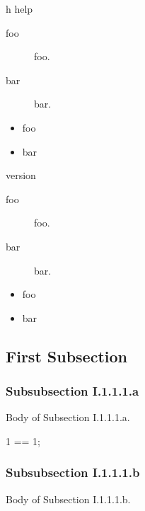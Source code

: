 \documentclass[openright,twoside,11pt]{book}
\begin{document}
\begin{options}
\item[h]{help} \optionHelp
  \begin{sublist}
    \begin{description}
    \item[foo] foo.
    \item[bar] bar.
    \end{description}
  \end{sublist}

  \begin{sublist}
    \begin{itemize}
    \item foo
    \item bar
    \end{itemize}
  \end{sublist}

\item{version} \optionVersion
  \begin{sublist}
    \begin{description}
    \item[foo] foo.
    \item[bar] bar.
    \end{description}

    \begin{itemize}
    \item foo
    \item bar
    \end{itemize}
  \end{sublist}
\end{options}

\subsection{First Subsection}
\subsubsection{Subsubsection I.1.1.1.a}
Body of Subsection I.1.1.1.a.

\begin{urbiassert}[firstnumber=1]
1 == 1;
\end{urbiassert}

\subsubsection{Subsubsection I.1.1.1.b}
Body of Subsection I.1.1.1.b.
\end{document}

